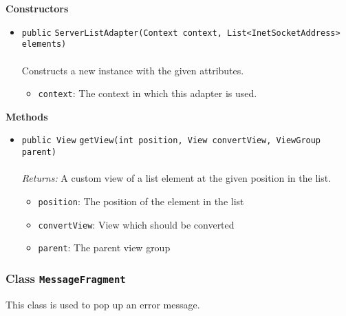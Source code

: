\textbf{\sffamily Constructors}
\begin{itemize}
\item \lstinline|public| \lstinline|ServerListAdapter|\lstinline|(Context context, List<InetSocketAddress> elements)|\\ \\[-0.6em]
Constructs a new instance with the given attributes.
\begin{itemize}
\item \lstinline|context|: The context in which this adapter is used.
\end{itemize}



\end{itemize}


\textbf{\sffamily Methods}
\begin{itemize}
\item \lstinline|public View| \lstinline|getView|\lstinline|(int position, View convertView, ViewGroup parent)|\\ \\[-0.6em]
\emph{Returns:} A custom view of a list element at the given position in the list.
\begin{itemize}
\item \lstinline|position|: The position of the element in the list
\item \lstinline|convertView|: View which should be converted
\item \lstinline|parent|: The parent view group
\end{itemize}



\end{itemize}

\subsubsection{Class \lstinline|MessageFragment|}
This class is used to pop up an error message. \\
\noindent\begin{minipage}[t]{5cm}
\vspace{0.3em}
\hspace*{2em}
\vspace{0.3em}
\end{minipage}



